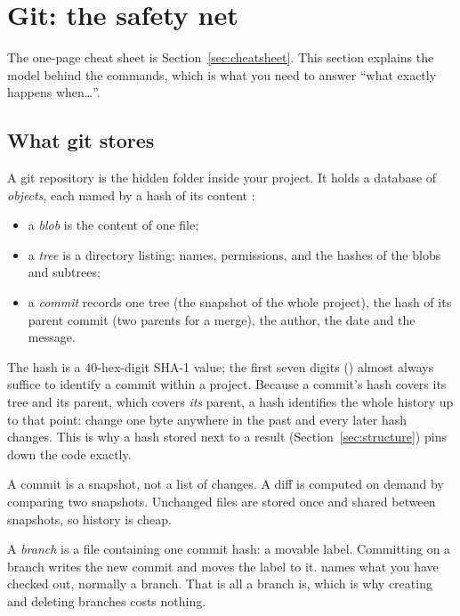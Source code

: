 \section{Git: the safety net}\label{sec:git}


The one-page cheat sheet is Section~\ref{sec:cheatsheet}. This section explains the model
behind the commands, which is what you need to answer ``what exactly happens when\dots''.

\subsection{What git stores}

A git repository is the hidden folder  inside your project. It holds a
database of \emph{objects}, each named by a hash of its content :
\begin{itemize}
  \item a \emph{blob} is the content of one file;
  \item a \emph{tree} is a directory listing: names, permissions, and the hashes of the
        blobs and subtrees;
  \item a \emph{commit} records one tree (the snapshot of the whole project), the hash of
        its parent commit (two parents for a merge), the author, the date and the message.
\end{itemize}
The hash is a 40-hex-digit SHA-1 value; the first seven digits () almost
always suffice to identify a commit within a project. Because a commit's hash covers its tree and its
parent, which covers \emph{its} parent, a hash identifies the whole history up to that
point: change one byte anywhere in the past and every later hash changes. This is why a
hash stored next to a result (Section~\ref{sec:structure}) pins down the code exactly.

A commit is a snapshot, not a list of changes. A diff is computed on demand by comparing
two snapshots. Unchanged files are stored once and shared between snapshots, so history
is cheap.

A \emph{branch} is a file containing one commit hash: a movable label. Committing on a
branch writes the new commit and moves the label to it.  names what you have
checked out, normally a branch. That is all a branch is, which is why creating and
deleting branches costs nothing.

